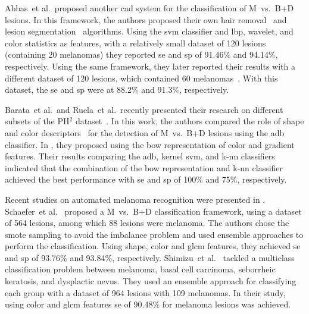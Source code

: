 Abbas~et al.\,\cite{abbas2012computer} proposed another \ac{cad} system for the classification of M~vs.~B+D lesions.
In this framework, the authors proposed their own hair removal~\cite{Abbas2011a} and lesion segmentation~\cite{Abbas2012} algorithms.
Using the \ac{svm} classifier and \ac{lbp}, wavelet, and color statistics as features, with a relatively small dataset of 120 lesions (containing 20 melanomas) they reported \ac{se} and \ac{sp} of 91.46$\%$ and 94.14$\%$, respectively.
Using the same framework, they later reported their results with a different dataset of 120 lesions, which contained 60 melanomas~\cite{abbas2013melanoma}.
With this dataset, the \ac{se} and \ac{sp} were at 88.2$\%$ and 91.3$\%$, respectively.

Barata~et al.\,\cite{barata2013two,barata2013role} and Ruela~et al.\,\cite{ruela2013role,ruela2013color} recently presented their research on different subsets of the PH$^{2}$ dataset~\cite{mendoncca2013ph}.
In this work, the authors compared the role of shape and color descriptors~\cite{ruela2013role,ruela2013color} for the detection of M~vs.~B+D lesions using the \ac{adb} classifier.
In \cite{barata2013two,barata2013towards}, they proposed using the \ac{bow} representation of color and gradient features.
Their results comparing the \ac{adb}, kernel \ac{svm}, and k-\ac{nn} classifiers indicated that the combination of the \ac{bow} representation and k-\ac{nn} classifier achieved the best performance with \ac{se} and \ac{sp} of 100$\%$ and 75$\%$, respectively.

Recent studies on automated melanoma recognition were presented in \cite{schaefer2014ensemble,Celebi2015}.
Schaefer~et al.~\cite{schaefer2014ensemble} proposed a M~vs.~B+D classification framework, using a dataset of 564 lesions, among which 88 lesions were melanoma.
The authors chose the \ac{smote} sampling to avoid the imbalance problem and used ensemble approaches to perform the classification.
Using shape, color and \ac{glcm} features, they achieved \ac{se} and \ac{sp} of 93.76$\%$ and 93.84$\%$, respectively.
Shimizu~et al.~\cite{Celebi2015} tackled a multiclass classification problem between melanoma, basal cell carcinoma, seborrheic keratosis, and dysplactic nevus.
They used an ensemble approach for classifying each group with a dataset of 964 lesions with 109 melanomas.
In their study, using color and \ac{glcm} features \ac{se} of 90.48$\%$ for melanoma lesions was achieved.


